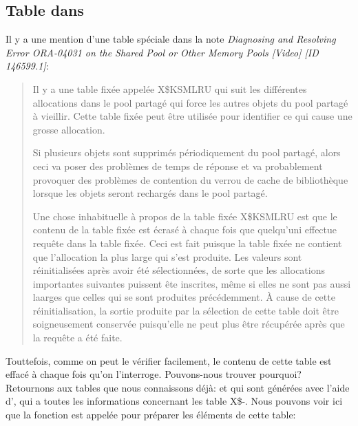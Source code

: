 \subsection{Table  dans \oracle}
\myindex{\oracle}

Il y a une mention d'une table spéciale dans la note \emph{Diagnosing and Resolving
Error ORA-04031 on the Shared Pool or Other Memory Pools [Video] [ID 146599.1]}:

\begin{framed}
\begin{quotation}
Il y a une table fixée appelée X\$KSMLRU qui suit les différentes allocations dans
le pool partagé qui force les autres objets du pool partagé à vieillir. Cette table
fixée peut être utilisée pour identifier ce qui cause une grosse allocation.

Si plusieurs objets sont supprimés périodiquement du pool partagé, alors ceci va poser des problèmes de temps de réponse
et va probablement provoquer des problèmes de contention du verrou de cache de bibliothèque lorsque
les objets seront rechargés dans le pool partagé.

Une chose inhabituelle à propos de la table fixée X\$KSMLRU est que le contenu de la table fixée est écrasé à chaque fois que
quelqu'uni effectue requête dans la table fixée. Ceci est fait puisque la table fixée ne contient que l'allocation la plus large
qui s'est produite. Les valeurs sont réinitialisées après avoir été sélectionnées, de sorte que les allocations importantes 
suivantes puissent ête inscrites, même si elles ne sont pas aussi laarges que celles qui se sont produites précédemment.
À cause de cette réinitialisation, la sortie produite par la sélection de cette table doit être soigneusement conservée
puisqu'elle ne peut plus être récupérée après que la requête a été faite.
\end{quotation}
\end{framed}

Touttefois, comme on peut le vérifier facilement, le contenu de cette table est effacé à chaque fois qu'on l'interroge.
Pouvons-nous trouver pourquoi?
Retournons aux tables que nous connaissons déjà:  et  qui
sont générées avec l'aide d'\oracletables, qui a toutes les informations concernant les table X\$-.
Nous pouvons voir ici que la fonction  est appelée pour préparer les éléments de cette table:

